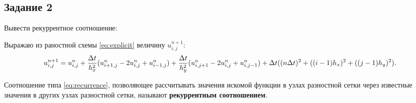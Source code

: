 \documentclass[12pt, a4paper]{report}
\begin{document}
	\subsection*{Задание 2}
	\large
	Вывести рекуррентное соотношение: \par
	Выражаю из раностной схемы \eqref{eq:explicit} величину $u_{i, j}^{n+1}$:
	\begin{equation}\label{eq:recurrence}
		\small
		u_{i, j}^{n+1} = u_{i, j}^{n} + \frac{\Delta t}{h_{x}^{2}}(u_{i+1, j}^{n} - 2u_{i, j}^{n} + u_{i-1, j}^{n}) + \frac{\Delta t}{h_{y}^{2}}(u_{i, j+1}^{n} - 2u_{i, j}^{n} + u_{i, j-1}^{n}) + \Delta t((n \Delta t)^{2} + ((i - 1)h_{x})^{2} + ((j - 1)h_{y})^{2}). 
	\end{equation}
	\par
	Соотношение типа \eqref{eq:recurrence}, позволяющее рассчитывать значения искомой функции в узлах разностной сетки через известные значения в других узлах разностной сетки, называют \textbf{рекуррентным соотношением}.
\end{document}

